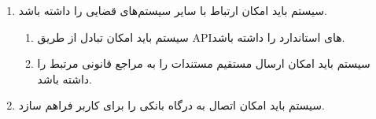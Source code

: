\documentclass[12pt,a4paper,oneside]{article}
\begin{document}
\begin{itemize}
\begin{enumerate}
        \item 
        سیستم باید امکان ارتباط با سایر سیستم‌های قضایی را داشته باشد.
        \begin{enumerate}
            \renewcommand{\labelenumii}{\textbf{.R\arabic{enumi}.\arabic{enumii}}}
            \item 
            سیستم باید امکان تبادل از طریق APIهای استاندارد را داشته باشد.
            \item 
            سیستم باید امکان ارسال مستقیم مستندات را به مراجع قانونی مرتبط را داشته باشد.
        \end{enumerate}

        \item 
        سیستم باید امکان اتصال به درگاه بانکی را برای کاربر فراهم سازد.
    \end{enumerate}
\end{itemize}
\end{document}
